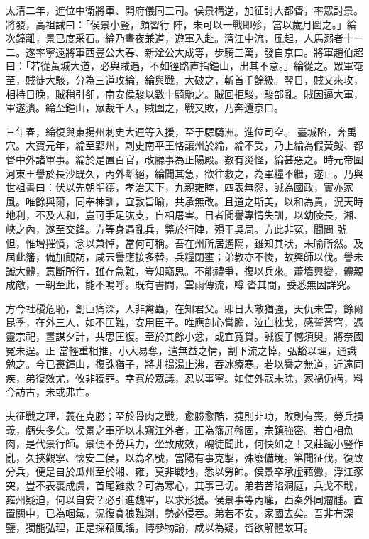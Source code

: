 \begin{pinyinscope}
 太清二年，進位中衛將軍、開府儀同三司。侯景構逆，加征討大都督，率眾討景。將發，高祖誡曰：「侯景小豎，頗習行
 陣，未可以一戰即殄，當以歲月圖之。」綸次鐘離，景已度采石。綸乃晝夜兼道，遊軍入赴。濟江中流，風起，人馬溺者十一二。遂率寧遠將軍西豊公大春、新淦公大成等，步騎三萬，發自京口。將軍趙伯超曰：「若從黃城大道，必與賊遇，不如徑路直指鐘山，出其不意。」綸從之。眾軍奄至，賊徒大駭，分為三道攻綸，綸與戰，大破之，斬首千餘級。翌日，賊又來攻，相持日晚，賊稍引卻，南安侯駿以數十騎馳之。賊回拒駿，駿部亂。賊因逼大軍，軍遂潰。綸至鐘山，眾裁千人，賊圍之，戰又敗，乃奔還京口。



 三年春，綸復與東揚州刺史大連等入援，至于驃騎洲。進位司空。
 臺城陷，奔禹穴。大寶元年，綸至郢州，刺史南平王恪讓州於綸，綸不受，乃上綸為假黃鉞、都督中外諸軍事。綸於是置百官，改廳事為正陽殿。數有災怪，綸甚惡之。時元帝圍河東王譽於長沙既久，內外斷絕，綸聞其急，欲往救之，為軍糧不繼，遂止。乃與世祖書曰：伏以先朝聖德，孝治天下，九親雍睦，四表無怨，誠為國政，實亦家風。唯餘與爾，同奉神訓，宜敦旨喻，共承無改。且道之斯美，以和為貴，況天時地利，不及人和，豈可手足肱支，自相屠害。日者聞譽專情失訓，以幼陵長，湘、峽之內，遂至交鋒。方等身遇亂兵，斃於行陣，殞于吳局。方此非冤，聞問
 號怛，惟增摧憤，念以兼悼，當何可稱。吾在州所居遙隔，雖知其狀，未喻所然。及屆此籓，備加覿訪，咸云譽應接多替，兵糧閉壅；弟教亦不悛，故興師以伐。譽未識大體，意斷所行，雖存急難，豈知竊思。不能禮爭，復以兵來。蕭墻興變，體親成敵，一朝至此，能不鳴呼。既有書問，雲雨傳流，噂沓其間，委悉無因詳究。



 方今社稷危恥，創巨痛深，人非禽蟲，在知君父。即日大敵猶強，天仇未雪，餘爾昆季，在外三人，如不匡難，安用臣子。唯應剖心嘗膽，泣血枕戈，感誓蒼穹，憑靈宗祀，晝謀夕計，共思匡復。至於其餘小忿，或宜寬貸。誠復子憾須臾，將奈國冤未逞。正
 當輕重相推，小大易奪，遣無益之情，割下流之悼，弘豁以理，通識勉之。今已喪鐘山，復誅猶子，將非揚湯止沸，吞冰療寒。若以譽之無道，近遠同疾，弟復效尤，攸非獨罪。幸寬於眾議，忍以事寧。如使外寇未除，家禍仍構，料今訪古，未或弗亡。



 夫征戰之理，義在克勝；至於骨肉之戰，愈勝愈酷，捷則非功，敗則有喪，勞兵損義，虧失多矣。侯景之軍所以未窺江外者，正為籓屏盤固，宗鎮強密。若自相魚肉，是代景行師。景便不勞兵力，坐致成效，醜徒聞此，何快如之！又莊鐵小豎作亂，久挾觀寧、懷安二侯，以為名號，當陽有事克掣，殊廢備境。第聞征伐，復致
 分兵，便是自於瓜州至於湘、雍，莫非戰地，悉以勞師。侯景卒承虛藉釁，浮江豕突，豈不表裹成虞，首尾難救？可為寒心，其事已切。弟若苦陷洞庭，兵戈不戢，雍州疑迫，何以自安？必引進魏軍，以求形援。侯景事等內癰，西秦外同瘤腫。直置關中，已為咽氣，況復貪狼難測，勢必侵吞。弟若不安，家國去矣。吾非有深鑒，獨能弘理，正是採藉風謠，博參物論，咸以為疑，皆欲解體故耳。




\end{pinyinscope}

